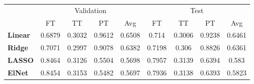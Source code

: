 \begin{tabular}{lcccccccc}
\toprule
{} & \multicolumn{4}{c}{Validation} & \multicolumn{4}{c}{Test} \\
{} &         FT &      TT &      PT &     Avg &      FT &      TT &      PT &     Avg \\
\midrule
\textbf{Linear} &     0.6879 &  0.3032 &  0.9612 &  0.6508 &   0.714 &  0.3006 &  0.9238 &  0.6461 \\
\textbf{Ridge } &     0.7071 &  0.2997 &  0.9078 &  0.6382 &  0.7198 &   0.306 &  0.8826 &  0.6361 \\
\textbf{LASSO } &     0.8464 &  0.3126 &  0.5504 &  0.5698 &  0.7957 &  0.3139 &  0.6394 &   0.583 \\
\textbf{ElNet } &     0.8454 &  0.3153 &  0.5482 &  0.5697 &  0.7936 &  0.3138 &  0.6393 &  0.5823 \\
\bottomrule
\end{tabular}
